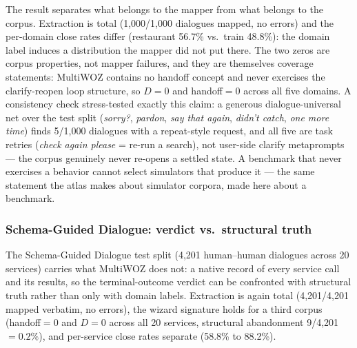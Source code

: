The result separates what belongs to the mapper from what belongs to the corpus.
Extraction is total (1{,}000/1{,}000 dialogues mapped, no errors) and the per-domain close
rates differ (restaurant 56.7\% vs.\ train 48.8\%): the domain label induces a distribution
the mapper did not put there.
The two zeros are corpus properties, not mapper failures, and they are themselves coverage
statements: MultiWOZ contains no handoff concept and never exercises the clarify-reopen loop
structure, so $D=0$ and handoff$=0$ across all five domains.
A consistency check stress-tested exactly this claim: a generous dialogue-universal net over
the test split (\emph{sorry?}, \emph{pardon}, \emph{say that again}, \emph{didn't catch},
\emph{one more time}) finds 5/1{,}000 dialogues with a repeat-style request, and all five are
task retries (\emph{check again please} = re-run a search), not user-side clarify metaprompts
--- the corpus genuinely never re-opens a settled state.
A benchmark that never exercises a behavior cannot select simulators that produce it --- the
same statement the atlas makes about simulator corpora, made here about a benchmark.

\subsubsection*{Schema-Guided Dialogue: verdict vs.\ structural truth}
The Schema-Guided Dialogue test split \citep{sgd2019,sgd2020} (4{,}201 human--human dialogues
across 20 services) carries what MultiWOZ does not: a native record of every service call and
its results, so the terminal-outcome verdict can be confronted with structural truth rather
than only with domain labels.
Extraction is again total (4{,}201/4{,}201 mapped verbatim, no errors), the wizard signature
holds for a third corpus (handoff$=0$ and $D=0$ across all 20 services, structural abandonment
9/4{,}201 $=0.2\%$), and per-service close rates separate (58.8\% to 88.2\%).

